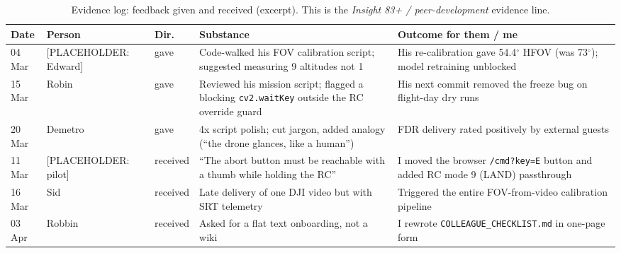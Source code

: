 \begin{table}[H]
\centering\footnotesize
\caption{Evidence log: feedback given and received (excerpt). This is the \emph{Insight 83+ / peer-development} evidence line.}\label{tab:feedback}
\begin{tabularx}{\textwidth}{@{}l l l X X@{}}
\toprule
\textbf{Date} & \textbf{Person} & \textbf{Dir.} & \textbf{Substance} & \textbf{Outcome for them / me} \\
\midrule
04\,Mar & [PLACEHOLDER: Edward] & gave & Code-walked his FOV calibration script; suggested measuring 9 altitudes not 1 & His re-calibration gave 54.4$^{\circ}$ HFOV (was 73$^{\circ}$); model retraining unblocked \\
15\,Mar & Robin & gave & Reviewed his mission script; flagged a blocking \texttt{cv2.waitKey} outside the RC override guard & His next commit removed the freeze bug on flight-day dry runs \\
20\,Mar & Demetro & gave & 4x script polish; cut jargon, added analogy (``the drone glances, like a human'') & FDR delivery rated positively by external guests \\
11\,Mar & [PLACEHOLDER: pilot] & received & ``The abort button must be reachable with a thumb while holding the RC'' & I moved the browser \texttt{/cmd?key=E} button and added RC mode 9 (LAND) passthrough \\
16\,Mar & Sid & received & Late delivery of one DJI video but with SRT telemetry & Triggered the entire FOV-from-video calibration pipeline \\
03\,Apr & Robbin & received & Asked for a flat text onboarding, not a wiki & I rewrote \texttt{COLLEAGUE\_CHECKLIST.md} in one-page form \\
\bottomrule
\end{tabularx}
\end{table}
